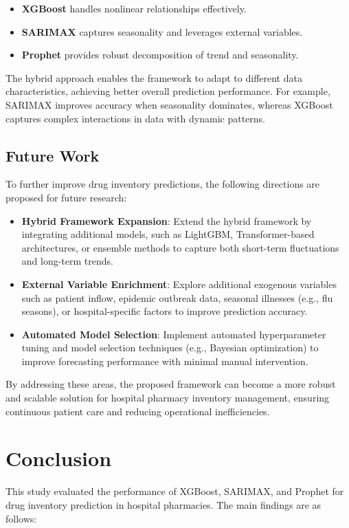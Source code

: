 \documentclass[journal]{IEEEtran}
\begin{document}
\begin{itemize}
    \item \textbf{XGBoost} handles nonlinear relationships effectively.
    \item \textbf{SARIMAX} captures seasonality and leverages external variables.
    \item \textbf{Prophet} provides robust decomposition of trend and seasonality.
\end{itemize}

The hybrid approach enables the framework to adapt to different data characteristics, achieving better overall prediction performance. For example, SARIMAX improves accuracy when seasonality dominates, whereas XGBoost captures complex interactions in data with dynamic patterns.

\subsection{Future Work}
To further improve drug inventory predictions, the following directions are proposed for future research:

\begin{itemize}
    \item \textbf{Hybrid Framework Expansion}: Extend the hybrid framework by integrating additional models, such as LightGBM, Transformer-based architectures, or ensemble methods to capture both short-term fluctuations and long-term trends.
    \item \textbf{External Variable Enrichment}: Explore additional exogenous variables such as patient inflow, epidemic outbreak data, seasonal illnesses (e.g., flu seasons), or hospital-specific factors to improve prediction accuracy.
    \item \textbf{Automated Model Selection}: Implement automated hyperparameter tuning and model selection techniques (e.g., Bayesian optimization) to improve forecasting performance with minimal manual intervention.
\end{itemize}

By addressing these areas, the proposed framework can become a more robust and scalable solution for hospital pharmacy inventory management, ensuring continuous patient care and reducing operational inefficiencies.

\section{Conclusion}
This study evaluated the performance of XGBoost, SARIMAX, and Prophet for drug inventory prediction in hospital pharmacies. The main findings are as follows:
\end{document}

